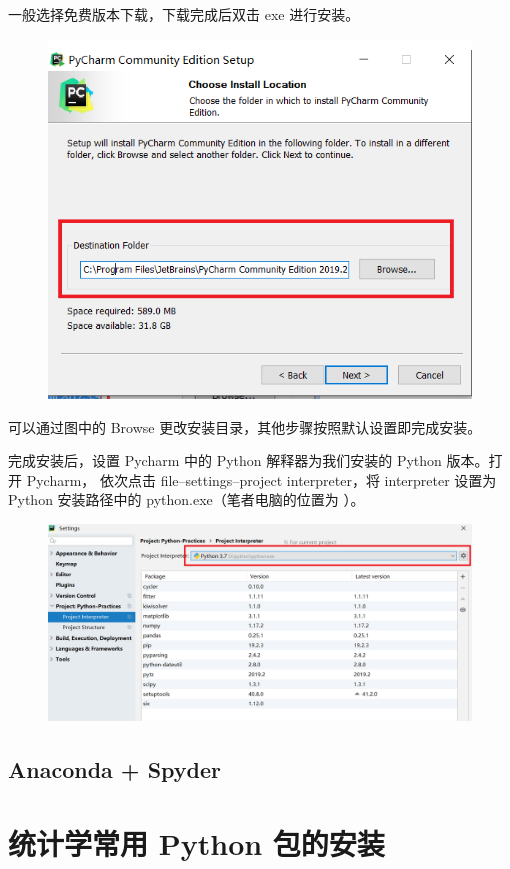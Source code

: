 一般选择免费版本下载，下载完成后双击 exe 进行安装。

\begin{figure}[!ht]
  \centering
  \includegraphics[scale=0.6]{figure/chapter1/pycharm2.png}
\end{figure}

可以通过图中的 Browse 更改安装目录，其他步骤按照默认设置即完成安装。

完成安装后，设置 Pycharm 中的 Python 解释器为我们安装的 Python 版本。打开 Pycharm， 依次点击 file--settings--project interpreter，将 interpreter 设置为Python 安装路径中的 python.exe（笔者电脑的位置为 ）。

\begin{figure}[!ht]
  \centering
  \includegraphics[scale=0.4]{figure/chapter1/pycharm3.png}
\end{figure}



\subsection{Anaconda + Spyder}

\section{统计学常用 Python 包的安装}
